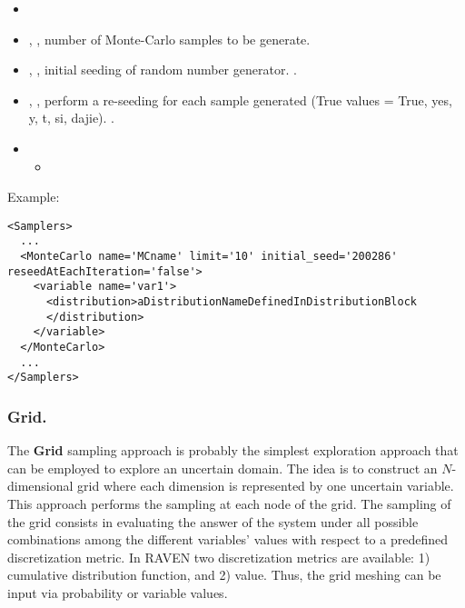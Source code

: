 %
\attrsIntro
\vspace{-5mm}
\begin{itemize}
\itemsep0em
\item \nameDescription
\item {}, , number of
  Monte-Carlo samples to be generate.
\item {}, , initial
  seeding of random number generator.
  .
\item {}, , perform a re-seeding for each sample generated
  (True values = True, yes, y, t, si, dajie).
  .
\end{itemize}
\vspace{-5mm}
\begin{itemize}
\item \variableDescription
 \variableChildIntro
 \begin{itemize}
    \item \distributionDescription
  \end{itemize}
\end{itemize}

Example:
\begin{lstlisting}[style=XML]
<Samplers>
  ...
  <MonteCarlo name='MCname' limit='10' initial_seed='200286' reseedAtEachIteration='false'> 
    <variable name='var1'> 
      <distribution>aDistributionNameDefinedInDistributionBlock
      </distribution>  
    </variable> 
  </MonteCarlo>
  ...
</Samplers>
\end{lstlisting}

\subsubsection{Grid.}
\label{subsubsubsec:Grid}
The \textbf{Grid} sampling approach is probably the simplest exploration
approach that can be employed to explore an uncertain domain.
%
The idea is to construct an $N$-dimensional grid where each dimension is
represented by one uncertain variable.
%
This approach performs the sampling at each node of the grid.
%
The sampling of the grid consists in evaluating the answer of the system under
all possible combinations among the different variables' values with respect to
a predefined discretization metric.
%
In RAVEN two discretization metrics are available: 1) cumulative distribution
function, and 2) value.
%
Thus, the grid meshing can be input via probability or variable values.

